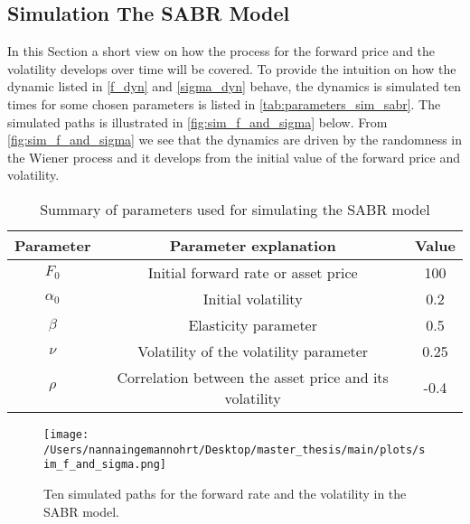 \subsection{Simulation The SABR Model}
In this Section a short view on how the process for the forward price and the volatility develops over time will be covered. 
To provide the intuition on how the dynamic listed in \autoref{f_dyn} and \autoref{sigma_dyn} behave, the dynamics is simulated ten times
for some chosen parameters is listed in \autoref{tab:parameters_sim_sabr}. 
The simulated paths is illustrated in \autoref{fig:sim_f_and_sigma} below. 
From \autoref{fig:sim_f_and_sigma} we see that the dynamics are driven by the randomness in the Wiener process and 
it develops from the initial value of the forward price and volatility.
\\
\begin{table}[H]
    \centering
    \begin{tabular}{ccc}
      \toprule
      \textbf{Parameter} & \textbf{Parameter explanation} & \textbf{Value} \\
      \midrule
      \rowcolor{lightgray!40}  $F_0$ & Initial forward rate or asset price & 100 \\
      $\alpha_0$ & Initial volatility  & 0.2 \\
      \rowcolor{lightgray!40}  $\beta$ & Elasticity parameter & 0.5 \\
      $\nu$ & Volatility of the volatility parameter & 0.25 \\
      \rowcolor{lightgray!40} $\rho$ & Correlation between the asset price and its volatility & -0.4 \\
      \bottomrule
    \end{tabular}
    \caption{Summary of parameters used for simulating the SABR model}
    \label{tab:parameters_sim_sabr}
\end{table}
\noindent

\begin{figure}[H]
    \centering
    \texttt{[image: /Users/nannaingemannohrt/Desktop/master\_thesis/main/plots/sim\_f\_and\_sigma.png]}
    \caption{Ten simulated paths for the forward rate and the volatility in the SABR model.}
    \label{fig:sim_f_and_sigma}
\end{figure}
\noindent
\newpage
